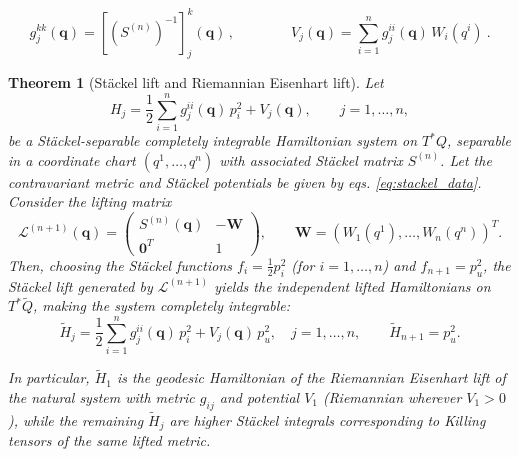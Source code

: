 \documentclass[10pt,a4paper]{amsart}
\newtheorem{theorem}{Theorem}
\newcommand{\bs}{\boldsymbol}
\begin{document}
	\begin{equation}\label{eq:stackel_data}
		g_{j}^{kk}(\boldsymbol{q})=[(S^{(n)})^{-1}]_{j}^{k}(\bs{q}) \, , \qquad\qquad V_{j}(\bs{q})=\sum_{i=1}^n g^{ii}_j(\boldsymbol{q})\, W_i(q^i) \ .
	\end{equation}

\begin{theorem}[Stäckel lift and Riemannian Eisenhart lift]\label{theo:1}
	Let
	\begin{equation}\label{eq:H}
		H_j = \frac{1}{2}\sum_{i=1}^n g^{ii}_j(\boldsymbol{q})\, p_i^2 + V_j(\boldsymbol{q}), \qquad j=1,\ldots,n,
	\end{equation}
	be a Stäckel-separable completely integrable Hamiltonian system on $T^{*}Q$, separable in a coordinate chart
	$(q^1,\ldots,q^n)$ with associated Stäckel matrix $S^{(n)}$.
	Let the contravariant metric and Stäckel potentials be given by eqs.
	\eqref{eq:stackel_data}.
	Consider the lifting matrix
	\begin{equation}\label{eq:lifting-matrix}
		\mathcal{L}^{(n+1)}(\boldsymbol{q})=
		\begin{pmatrix}
			S^{(n)}(\boldsymbol{q}) & -\boldsymbol{W} \\
			\boldsymbol{0}^T & 1
		\end{pmatrix},
		\qquad
		\boldsymbol{W}=(W_1(q^1),\ldots,W_n(q^n))^T .
	\end{equation}
	Then, choosing the Stäckel functions $f_i = \frac{1}{2}p_i^2$ (for $i=1,\ldots,n$) and $f_{n+1} = p_u^2$, the Stäckel lift generated by $\mathcal{L}^{(n+1)}$ yields the independent lifted Hamiltonians on $T^{*}\tilde{Q}$, making the system completely integrable: 
	\begin{equation}\label{eq:lifted-H}
		\tilde H_j
		= \frac{1}{2}\sum_{i=1}^n g^{ii}_j(\boldsymbol{q})\, p_i^2
		+ V_j(\boldsymbol{q})\, p_u^2, \quad j=1,\ldots,n,\qquad \tilde{H}_{n+1}=p_u^2.
	\end{equation}
	
	
In particular, $\tilde H_1$ is the geodesic Hamiltonian of the Riemannian Eisenhart lift of the natural system with metric $g_{ij}$ and potential $V_1$ (Riemannian wherever $V_1>0$), while the remaining $\tilde H_j$ are higher Stäckel integrals corresponding to Killing tensors of the same lifted metric.
\end{theorem}
\end{document}
